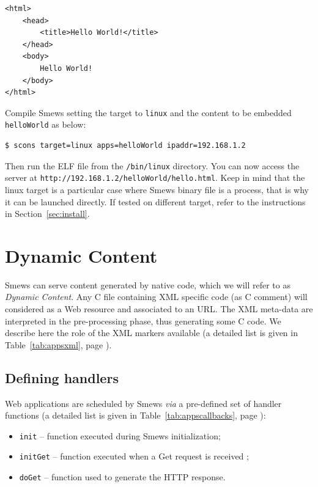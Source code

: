 \documentclass{report}
\newcommand{\rsec}[1]{Section~\ref{sec:#1}}
\newcommand{\rtab}[1]{Table~\ref{tab:#1}}
\begin{document}
\lstset{language=html}
\begin{lstlisting}
<html>
    <head>
        <title>Hello World!</title>
    </head>
    <body>
        Hello World!
    </body>
</html>
\end{lstlisting}

Compile Smews setting the target to \verb+linux+ and the content to be embedded \verb+helloWorld+ as below:
\begin{verbatim}
$ scons target=linux apps=helloWorld ipaddr=192.168.1.2
\end{verbatim}

Then run the ELF file from the \texttt{/bin/linux} directory. You can now access the server at \verb+http://192.168.1.2/helloWorld/hello.html+. Keep in mind that the linux target is a particular case where Smews binary file is a process, that is why it can be launched directly. If tested on different target, refer to the instructions in \rsec{install}.

\section{Dynamic Content}

Smews can serve content generated by native code, which we will refer to as \textit{Dynamic Content}. Any C file containing XML specific code (as C comment) will considered as a Web resource and associated to an URL. The XML meta-data are interpreted in the pre-processing phase, thus generating some C code. We describe here the role of the XML markers available (a detailed list is given in \rtab{appsxml}, page \pageref{tab:appsxml}).

\subsection{Defining handlers}

Web applications are scheduled by Smews {\it via} a pre-defined set of handler functions (a detailed list is given in \rtab{appscallbacks}, page \pageref{tab:appscallbacks}):
\begin{itemize}
\item \verb+init+ -- function executed during Smews initialization;
\item \verb+initGet+ -- function executed when a Get request is received ;
\item \verb+doGet+ -- function used to generate the HTTP response.
\end{itemize}
\end{document}
